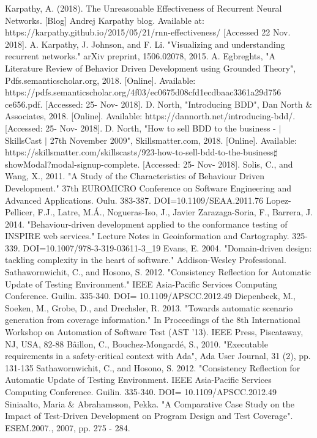 \documentclass[conference, onecolumn, a4, 12pt]{IEEEtran}
\begin{document}
\begin{thebibliography}{00}
 Karpathy, A. (2018). The Unreasonable Effectiveness of Recurrent Neural Networks. [Blog] Andrej Karpathy blog. Available at: https://karpathy.github.io/2015/05/21/rnn-effectiveness/ [Accessed 22 Nov. 2018].
 A. Karpathy, J. Johnson, and F. Li. "Visualizing and understanding recurrent networks." arXiv preprint, 1506.02078, 2015.
 A. Egbreghts, "A Literature Review of Behavior Driven Development using Grounded Theory", Pdfs.semanticscholar.org, 2018. [Online]. Available: https://pdfs.semanticscholar.org/4f03/ec0675d08cfd1ecdbaac3361a29d756
ce656.pdf. [Accessed: 25- Nov- 2018].
 D. North, "Introducing BDD", Dan North \& Associates, 2018. [Online]. Available: https://dannorth.net/introducing-bdd/. [Accessed: 25- Nov- 2018].
 D. North, "How to sell BDD to the business - $\mid$ SkillsCast $\mid$ 27th November 2009", Skillsmatter.com, 2018. [Online]. Available: https://skillsmatter.com/skillscasts/923-how-to-sell-bdd-to-the-business$\sharp$showModal?modal-signup-complete. [Accessed: 25- Nov- 2018].
 Solis, C., and Wang, X., 2011. "A Study of the Characteristics of Behaviour Driven Development." 37th EUROMICRO Conference on Software Engineering and
Advanced Applications. Oulu. 383-387. DOI=10.1109/SEAA.2011.76
 Lopez-Pellicer, F.J., Latre, M.Á., Nogueras-Iso, J., Javier Zarazaga-Soria, F., Barrera, J. 2014. "Behaviour-driven development applied to the conformance testing of
INSPIRE web services." Lecture Notes in Geoinformation and Cartography. 325-339. DOI=10.1007/978-3-319-03611-3\_19
 Evans, E. 2004. "Domain-driven design: tackling complexity in the heart of software." Addison-Wesley Professional.
 Sathawornwichit, C., and Hosono, S. 2012. "Consistency Reflection for Automatic Update of Testing Environment." IEEE Asia-Pacific Services Computing Conference.
Guilin. 335-340. DOI= 10.1109/APSCC.2012.49
 Diepenbeck, M., Soeken, M., Grobe, D., and Drechsler, R. 2013. "Towards automatic scenario generation from coverage information." In Proceedings of the 8th International Workshop on Automation of Software Test (AST '13). IEEE Press, Piscataway, NJ, USA, 82-88
 Bâillon, C., Bouchez-Mongardé, S., 2010. "Executable requirements in a safety-critical context with Ada", Ada User Journal, 31 (2), pp. 131-135
 Sathawornwichit, C., and Hosono, S. 2012. "Consistency Reflection for Automatic Update of Testing Environment. IEEE Asia-Pacific Services Computing Conference.
Guilin. 335-340. DOI= 10.1109/APSCC.2012.49
Siniaalto, Maria \& Abrahamsson, Pekka. "A Comparative Case Study on the Impact of Test-Driven Development on Program Design and Test Coverage". ESEM.2007., 2007, pp. 275 - 284.

\end{thebibliography}
\end{document}
